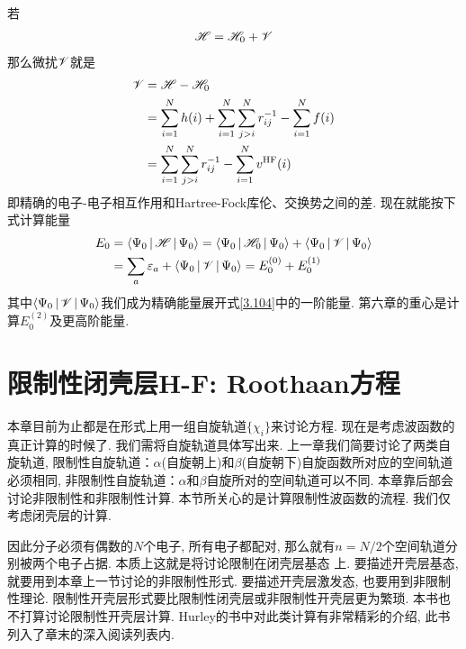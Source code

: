 若
\begin{align}\label{3.107}
	\mathscr{H} = \mathscr{H}_0 + \mathscr{V}
\end{align}
那么微扰$\mathscr{V}$就是
\begin{align}
	\mathscr{V} & = \mathscr{H} -\mathscr{H}_0\notag\\
	& = \sum_{i=1}^{N}h(i) + \sum_{i=1}^{N}\sum_{j>i}^{N}r_{ij}^{-1} - \sum_{i=1}^{N}f(i)\notag\\
	& = \sum_{i=1}^{N}\sum_{j>i}^{N}r_{ij}^{-1} - \sum_{i=1}^{N}v^\mathrm{HF}(i)
	\label{3.108}
\end{align}
即精确的电子-电子相互作用和Hartree-Fock库伦、交换势之间的差. 
现在就能按下式计算\hft 能量
\begin{align}\label{3.109}
	E_0 & = \Braket{\Psi_0|\mathscr{H}|\Psi_0} = \Braket{\Psi_0|\mathscr{H}_0|\Psi_0} + \Braket{\Psi_0|\mathscr{V}|\Psi_0} \notag\\
	& = \sum_a\varepsilon_a + \Braket{\Psi_0|\mathscr{V}|\Psi_0} = E_0^{(0)} + E_0^{(1)}
\end{align}
其中$\Braket{\Psi_0|\mathscr{V}|\Psi_0}$我们成为精确能量展开式\eqref{3.104}中的一阶能量. 
第六章的重心是计算$E_0^{(2)}$及更高阶能量.

\section{限制性闭壳层H-F: Roothaan方程}
本章目前为止都是在形式上用一组自旋轨道$\{\chi_i\}$来讨论\hft 方程. 
现在是考虑\hft 波函数的真正计算的时候了. 
我们需将自旋轨道具体写出来. 
上一章我们简要讨论了两类自旋轨道, 
限制性自旋轨道：$\alpha$(自旋朝上)和$\beta$(自旋朝下)自旋函数所对应的空间轨道必须相同, 
非限制性自旋轨道：$\alpha$和$\beta$自旋所对的空间轨道可以不同. 
本章靠后部会讨论非限制性\hft 和非限制性\hft 计算. 
本节所关心的是计算限制性\hft 波函数的流程. 
我们仅考虑闭壳层的计算.

因此分子必须有偶数的$N$个电子, 所有电子都配对, 那么就有$n=N/2$个空间轨道分别被两个电子占据. 本质上这就是将讨论限制在闭壳层基态
上. 
要描述开壳层基态, 就要用到本章上一节讨论的非限制性形式. 
要描述开壳层激发态, 也要用到非限制性\hft 理论. 
限制性开壳层形式要比限制性闭壳层或非限制性开壳层更为繁琐. 
本书也不打算讨论限制性开壳层\hft 计算. 
Hurley的书中对此类计算有非常精彩的介绍, 此书列入了章末的深入阅读列表内.
